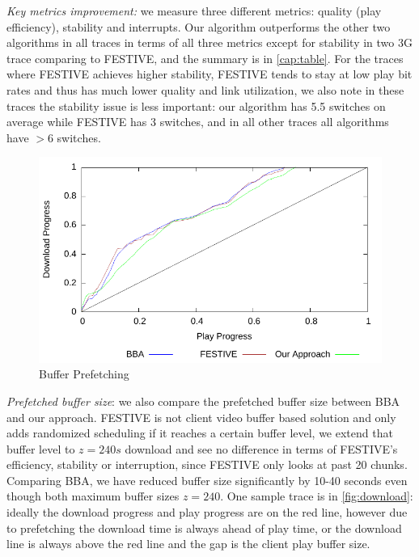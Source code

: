 \emph{Key metrics improvement:} we measure three different metrics: quality (play efficiency), stability and interrupts. Our algorithm outperforms the other two algorithms in all traces in terms of all three metrics except for stability in two 3G trace comparing to FESTIVE, and the summary is in \autoref{cap:table}. For the traces where FESTIVE achieves higher stability, FESTIVE tends to stay at low play bit rates and thus has much lower quality and link utilization, we also note in these traces the stability issue is less important: our algorithm has 5.5 switches on average while FESTIVE has 3 switches, and in all other traces all algorithms have $>$6 switches. 
\begin{figure}[t]
\centering
 \includegraphics[width=\linewidth]{pictures/ATT_downloading.pdf}
 \caption{Buffer Prefetching} \label{fig:download}
\end{figure}

\emph{Prefetched buffer size}: we also compare the prefetched buffer size between BBA and our approach. FESTIVE is not client video buffer based solution and only adds randomized scheduling if it reaches a certain buffer level, we extend that buffer level to $z=240s$ download and see no difference in terms of FESTIVE's efficiency, stability or interruption, since FESTIVE only looks at past 20 chunks. Comparing BBA, we have reduced buffer size significantly by 10-40 seconds even though both maximum buffer sizes $z=240$. One sample trace is in \autoref{fig:download}: ideally the download progress and play progress are on the red line, however due to prefetching the download time is always ahead of play time, or the download line is always above the red line and the gap is the client play buffer size.

